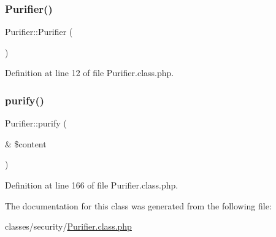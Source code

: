 \subsubsection{\texorpdfstring{Purifier()}{Purifier()}}
{\footnotesize\ttfamily Purifier\+::\+Purifier (\begin{DoxyParamCaption}{ }\end{DoxyParamCaption})}



Definition at line 12 of file Purifier.\+class.\+php.

\hypertarget{classPurifier_a8ef72146a37ba4e10453c9465835bd67}{}\label{classPurifier_a8ef72146a37ba4e10453c9465835bd67} 
\subsubsection{\texorpdfstring{purify()}{purify()}}
{\footnotesize\ttfamily Purifier\+::purify (\begin{DoxyParamCaption}\item[{\&}]{\$content }\end{DoxyParamCaption})}



Definition at line 166 of file Purifier.\+class.\+php.



The documentation for this class was generated from the following file\+:\begin{DoxyCompactItemize}
\item 
classes/security/\hyperlink{Purifier_8class_8php}{Purifier.\+class.\+php}\end{DoxyCompactItemize}

